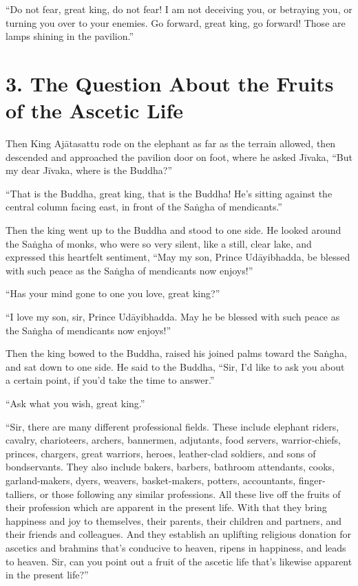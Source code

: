 \documentclass[12pt,openany]{book}%
\begin{document}
“Do not fear, great king, do not fear! I am not deceiving you, or betraying you, or turning you over to your enemies. Go forward, great king, go forward! Those are lamps shining in the pavilion.” 

\section*{3. The Question About the Fruits of the Ascetic Life }

Then King \textsanskrit{Ajātasattu} rode on the elephant as far as the terrain allowed, then descended and approached the pavilion door on foot, where he asked \textsanskrit{Jīvaka}, “But my dear \textsanskrit{Jīvaka}, where is the Buddha?” 

“That is the Buddha, great king, that is the Buddha! He’s sitting against the central column facing east, in front of the \textsanskrit{Saṅgha} of mendicants.” 

Then the king went up to the Buddha and stood to one side. He looked around the \textsanskrit{Saṅgha} of monks, who were so very silent, like a still, clear lake, and expressed this heartfelt sentiment, “May my son, Prince \textsanskrit{Udāyibhadda}, be blessed with such peace as the \textsanskrit{Saṅgha} of mendicants now enjoys!” 

“Has your mind gone to one you love, great king?” 

“I love my son, sir, Prince \textsanskrit{Udāyibhadda}. May he be blessed with such peace as the \textsanskrit{Saṅgha} of mendicants now enjoys!” 

Then the king bowed to the Buddha, raised his joined palms toward the \textsanskrit{Saṅgha}, and sat down to one side. He said to the Buddha, “Sir, I’d like to ask you about a certain point, if you’d take the time to answer.” 

“Ask what you wish, great king.” 

“Sir, there are many different professional fields. These include elephant riders, cavalry, charioteers, archers, bannermen, adjutants, food servers, warrior-chiefs, princes, chargers, great warriors, heroes, leather-clad soldiers, and sons of bondservants. They also include bakers, barbers, bathroom attendants, cooks, garland-makers, dyers, weavers, basket-makers, potters, accountants, finger-talliers, or those following any similar professions. All these live off the fruits of their profession which are apparent in the present life. With that they bring happiness and joy to themselves, their parents, their children and partners, and their friends and colleagues. And they establish an uplifting religious donation for ascetics and brahmins that’s conducive to heaven, ripens in happiness, and leads to heaven. Sir, can you point out a fruit of the ascetic life that’s likewise apparent in the present life?” 
\end{document}
